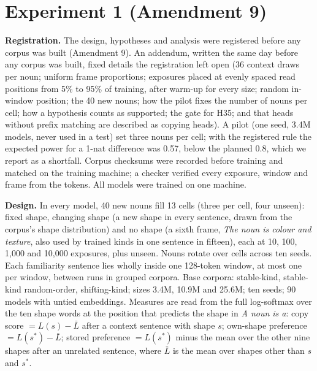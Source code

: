 \FloatBarrier
\section{Experiment 1 (Amendment 9)}\label{app:M}
\setcounter{table}{0}
\setcounter{figure}{0}
\textbf{Registration.} The design, hypotheses and analysis were registered before any corpus was built (Amendment 9). An addendum, written the same day before any corpus was built, fixed details the registration left open (36 context draws per noun; uniform frame proportions; exposures placed at evenly spaced read positions from 5\% to 95\% of training, after warm-up for every size; random in-window position; the 40 new nouns; how the pilot fixes the number of nouns per cell; how a hypothesis counts as supported; the gate for H35; and that heads without prefix matching are described as copying heads). A pilot (one seed, 3.4M models, never used in a test) set three nouns per cell; with the registered rule the expected power for a 1-nat difference was 0.57, below the planned 0.8, which we report as a shortfall. Corpus checksums were recorded before training and matched on the training machine; a checker verified every exposure, window and frame from the tokens. All models were trained on one machine.

\textbf{Design.} In every model, 40 new nouns fill 13 cells (three per cell, four unseen): fixed shape, changing shape (a new shape in every sentence, drawn from the corpus's shape distribution) and no shape (a sixth frame, \emph{The \textit{noun} is \textit{colour} and \textit{texture}}, also used by trained kinds in one sentence in fifteen), each at 10, 100, 1,000 and 10,000 exposures, plus unseen. Nouns rotate over cells across ten seeds. Each familiarity sentence lies wholly inside one 128-token window, at most one per window, between runs in grouped corpora. Base corpora: stable-kind, stable-kind random-order, shifting-kind; sizes 3.4M, 10.9M and 25.6M; ten seeds; 90 models with untied embeddings. Measures are read from the full log-softmax over the ten shape words at the position that predicts the shape in \emph{A \textit{noun} is a}: copy score $= L(s) - \bar L$ after a context sentence with shape $s$; own-shape preference $= L(s^*) - \bar L$; stored preference $= L(s^*)$ minus the mean over the other nine shapes after an unrelated sentence, where $\bar L$ is the mean over shapes other than $s$ and $s^*$.


